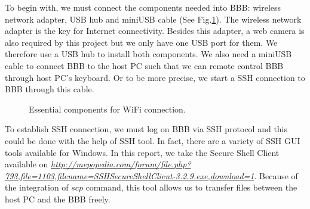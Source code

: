 \documentclass[12pt,journal,draftclsnofoot,onecolumn]{IEEEtran}
\begin{document}
To begin with, we must connect the components needed into BBB: wireless network adapter, USB hub and miniUSB cable (See Fig.\ref{WiFi}). The wireless network adapter is the key for Internet connectivity. Besides this adapter, a web camera is also required by this project but we only have one USB port for them.  We therefore use a USB hub to install both components. We also need a miniUSB cable to connect BBB to the host PC such that we can remote control BBB through host PC's keyboard. Or to be more precise, we start a SSH connection to BBB through this cable.

\begin{figure}[htb]
	\centering
     \caption{Essential components for WiFi connection.}
     \label{WiFi}
     \end{figure}


To establish SSH connection, we must log on BBB via SSH protocol and this could be done with the help of SSH tool. In fact, there are a variety of SSH GUI tools available for Windows. In this report, we take the Secure Shell Client available on \textcolor{blue}{\textit{\url{http://mepopedia.com/forum/file.php?793,file=1103,filename=SSHSecureShellClient-3.2.9.exe,download=1}}}. Because of the integration of $scp$ command, this tool allows us to transfer files between the host PC and the BBB freely.
\end{document}
